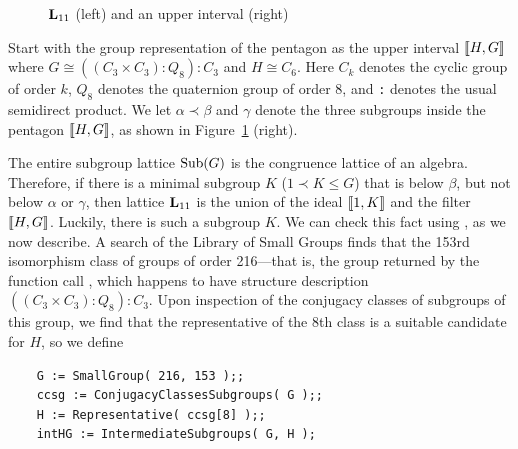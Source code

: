 \begin{figure}[htb]
\begin{center}
  \hskip1cm
\end{center}
\caption{$\mathbf{L}_{11}$ (left) and an upper interval (right)}\label{fig:L11}
\end{figure}
Start with the group representation of the pentagon as the upper
interval $\llbracket H, G\rrbracket$ where $G \cong ((C_3 \times C_3) : Q_8) : C_3$ and 
$H \cong C_6$.
Here $C_k$ denotes the cyclic group of order $k$, $Q_8$ denotes the
quaternion group of order 8, and {\tt :} denotes the usual semidirect product.
We let $\alpha \prec \beta$ and $\gamma$ denote the three subgroups inside the
pentagon $\llbracket H, G \rrbracket$, as shown in Figure~\ref{fig:L11} (right).

The entire subgroup lattice $\operatorname{Sub}(G)$ is the congruence lattice of an
algebra. Therefore, if there is a minimal subgroup $K$ ($1 \prec K \leq G$) that
is below $\beta$, but not below  $\alpha$ or $\gamma$, then lattice $\mathbf{L}_{11}$ is the 
union of the ideal $\llbracket 1, K\rrbracket$ and the filter $\llbracket H, G\rrbracket$.
Luckily, there is such a subgroup $K$. We can check this fact using \gap, as we now describe.
A search of the \gap Library of Small Groups finds that the 153rd
isomorphism class of groups of order 216---that is, the group 
returned by the function call , which happens to have
structure description $((C_3 \times C_3) : Q_8) : C_3$.
Upon inspection of the conjugacy classes of subgroups of this group, we 
find that the representative of the 8th class is a suitable candidate for 
$H$, so we define 

{\small 
\begin{verbatim}
    G := SmallGroup( 216, 153 );;    
    ccsg := ConjugacyClassesSubgroups( G );;
    H := Representative( ccsg[8] );;
    intHG := IntermediateSubgroups( G, H );
\end{verbatim}
}


